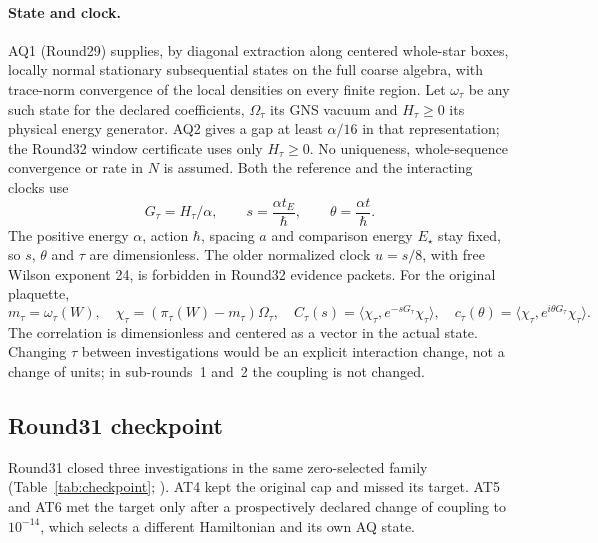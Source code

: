 \paragraph{State and clock.}
AQ1 (Round29) supplies, by diagonal extraction along centered whole-star boxes,
locally normal stationary subsequential states on the full coarse algebra, with
trace-norm convergence of the local densities on every finite region. Let
$\omega_\tau$ be any such state for the declared coefficients, $\Omega_\tau$ its
GNS vacuum and $H_\tau\ge0$ its physical energy generator. AQ2 gives a gap at
least $\alpha/16$ in that representation; the Round32 window certificate uses
only $H_\tau\ge0$. No uniqueness, whole-sequence convergence or rate in $N$ is
assumed. Both the reference and the interacting clocks use
\begin{equation}
 G_\tau=H_\tau/\alpha,\qquad s=\frac{\alpha t_E}{\hbar},\qquad
 \theta=\frac{\alpha t}{\hbar}.
 \label{eq:dict-clock}
\end{equation}
The positive energy $\alpha$, action $\hbar$, spacing $a$ and comparison energy
$E_\star$ stay fixed, so $s$, $\theta$ and $\tau$ are dimensionless. The older
normalized clock $u=s/8$, with free Wilson exponent 24, is forbidden in Round32
evidence packets. For the original plaquette,
\begin{equation}
 m_\tau=\omega_\tau(W),\quad
 \chi_\tau=(\pi_\tau(W)-m_\tau)\Omega_\tau,\quad
 C_\tau(s)=\langle\chi_\tau,e^{-sG_\tau}\chi_\tau\rangle,\quad
 c_\tau(\theta)=\langle\chi_\tau,e^{i\theta G_\tau}\chi_\tau\rangle .
 \label{eq:dict-observable}
\end{equation}
The correlation is dimensionless and centered as a vector in the actual state.
Changing $\tau$ between investigations would be an explicit interaction change,
not a change of units; in sub-rounds~1 and~2 the coupling is not changed.

\subsection{Round31 checkpoint}
\label{sec:checkpoint}

Round31 closed three investigations in the same zero-selected family
(Table~\ref{tab:checkpoint}; ). AT4 kept the original cap and missed its target. AT5 and AT6 met
the target only after a prospectively declared change of coupling to
$10^{-14}$, which selects a different Hamiltonian and its own AQ state.

